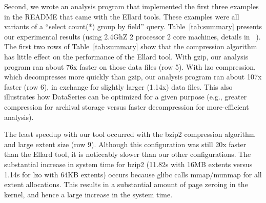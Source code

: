 \documentclass{acm_proc_article-sp}
\begin{document}
Second, we
wrote an analysis program that implemented the first three examples in
the README that came with the Ellard tools.  
These examples were
all variants of a ``select count(*) group by field'' query.
Table~\ref{tab:summary} presents our experimental results
(using 2.4GhZ 2 processor 2 core machines, details 
in ~\cite{DSTechnicalReportSnapshot}).
The first two rows of Table~\ref{tab:summary} show that the compression 
algorithm has little effect on the performance
of the Ellard tool.  
With gzip, our analysis program ran about 76x faster on those data files 
(row 5).
With lzo compression, which decompresses more quickly than
gzip, our analysis program ran about 107x faster (row 6), in exchange for
slightly larger (1.14x) data files.  This also illustrates how
DataSeries can be optimized for a given purpose (e.g., greater
compression for archival storage versus faster decompression for 
more-efficient analysis). 

The least speedup with our tool occurred with the bzip2 compression
algorithm and large extent size (row 9).
Although this configuration was still 20x faster than the Ellard tool,
it is noticeably slower than our other configurations.  The substantial
increase in system time for bzip2 (11.82s with 16MB extents versus
1.14s for lzo with 64KB extents) occurs because glibc calls
mmap/munmap for all extent allocations.  This results in a substantial amount of page
zeroing in the kernel, and hence a large increase in the system time. 



\end{document}
